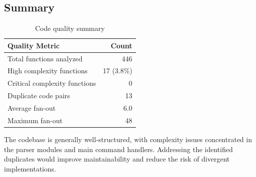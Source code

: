 \subsection{Summary}

\begin{table}[h]
\centering
\begin{tabular}{lr}
\toprule
\textbf{Quality Metric} & \textbf{Count} \\
\midrule
Total functions analyzed & 446 \\
High complexity functions & 17 (3.8\%) \\
Critical complexity functions & 0 \\
Duplicate code pairs & 13 \\
Average fan-out & 6.0 \\
Maximum fan-out & 48 \\
\bottomrule
\end{tabular}
\caption{Code quality summary}
\label{tab:quality-summary}
\end{table}

The codebase is generally well-structured, with complexity issues concentrated in the parser modules and main command handlers. Addressing the identified duplicates would improve maintainability and reduce the risk of divergent implementations.
